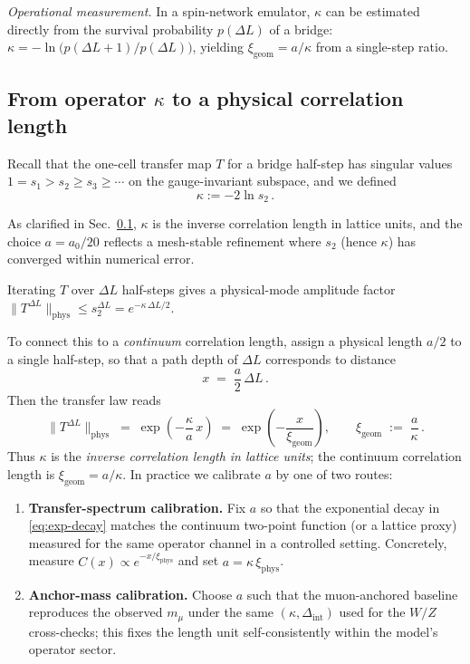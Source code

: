 \documentclass[11pt]{article}
\theoremstyle{plain}
\theoremstyle{definition}
\begin{document}
\noindent\emph{Operational measurement.} In a spin-network emulator, $\kappa$ can be estimated directly from the survival probability $p(\Delta L)$ of a bridge: $\kappa = -\ln\!\big(p(\Delta L{+}1)/p(\Delta L)\big)$, yielding $\xi_{\mathrm{geom}}=a/\kappa$ from a single-step ratio.

\subsection{From operator \texorpdfstring{$\kappa$}{kappa} to a physical correlation length}\label{subsec:kappa-corrlen}

Recall that the one-cell transfer map $T$ for a bridge half-step has singular values $1=s_1>s_2\ge s_3\ge\cdots$ on the gauge-invariant subspace, and we defined
\begin{equation}\label{eq:kappa-def}
  \kappa := -2\ln s_2 \,.
\end{equation}

As clarified in Sec.~\ref{subsec:kappa-corrlen}, $\kappa$ is the inverse correlation length in lattice units, and the choice $a=a_0/20$ reflects a mesh-stable refinement where $s_2$ (hence $\kappa$) has converged within numerical error.

Iterating $T$ over $\Delta L$ half-steps gives a physical-mode amplitude factor $\|T^{\Delta L}\|_{\mathrm{phys}} \le s_2^{\Delta L} = e^{-\kappa\,\Delta L/2}$.

To connect this to a \emph{continuum} correlation length, assign a physical length $a/2$ to a single half-step, so that a path depth of $\Delta L$ corresponds to distance
\begin{equation}
  x \;=\; \frac{a}{2}\,\Delta L \,.
\end{equation}
Then the transfer law reads
\begin{equation}\label{eq:exp-decay}
  \|T^{\Delta L}\|_{\mathrm{phys}} \;=\; \exp\!\left(-\frac{\kappa}{a}\,x\right) \;=\; \exp\!\left(-\frac{x}{\xi_{\mathrm{geom}}}\right),\qquad
  \xi_{\mathrm{geom}} \;:=\; \frac{a}{\kappa}\,.
\end{equation}
Thus $\kappa$ is the \emph{inverse correlation length in lattice units}; the continuum correlation length is $\xi_{\mathrm{geom}}=a/\kappa$. In practice we calibrate $a$ by one of two routes:

\begin{enumerate}[label=(\alph*)]
  \item \textbf{Transfer-spectrum calibration.} Fix $a$ so that the exponential decay in \eqref{eq:exp-decay} matches the continuum two-point function (or a lattice proxy) measured for the same operator channel in a controlled setting. Concretely, measure $C(x)\propto e^{-x/\xi_{\mathrm{phys}}}$ and set $a=\kappa\,\xi_{\mathrm{phys}}$.

  \item \textbf{Anchor-mass calibration.} Choose $a$ such that the muon-anchored baseline reproduces the observed $m_\mu$ under the same $(\kappa,\Delta_{\mathrm{int}})$ used for the $W/Z$ cross-checks; this fixes the length unit self-consistently within the model’s operator sector.
\end{enumerate}
\end{document}
